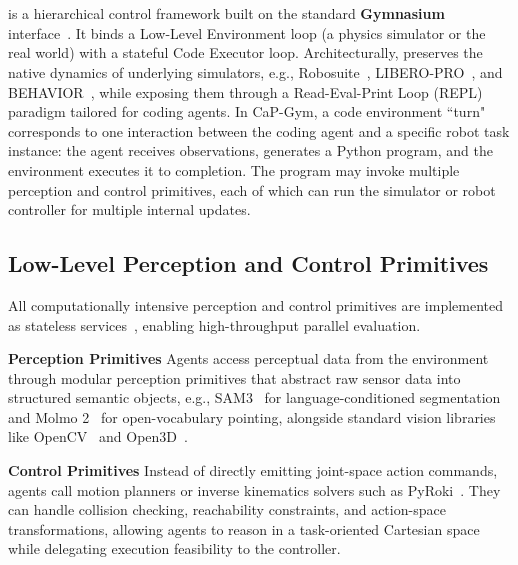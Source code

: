 \section{\gymname{}} 
\gymname{} is a hierarchical control framework built on the standard \textbf{Gymnasium} interface~\citep{brockman2016openai}. It binds a Low-Level Environment loop (a physics simulator or the real world) with a stateful Code Executor loop. 
Architecturally, \gymname{} preserves the native dynamics of underlying simulators, e.g., Robosuite~\citep{zhu2020robosuite}, LIBERO-PRO~\citep{liu2023libero, zhou2025liberopro}, and BEHAVIOR~\citep{li2024behavior1k}, while exposing them through a Read-Eval-Print Loop (REPL) paradigm tailored for coding agents. In CaP-Gym, a code environment ``turn" corresponds to one interaction between the coding agent and a specific robot task instance: the agent receives observations, generates a Python program, and the environment executes it to completion. The program may invoke multiple perception and control primitives, each of which can run the simulator or robot controller for multiple internal updates.

\subsection{Low-Level Perception and Control Primitives}
All computationally intensive perception and control primitives are implemented as stateless services~\cite{uvicorn}, enabling high-throughput parallel evaluation.

\textbf{Perception Primitives} 
Agents access perceptual data from the environment through modular perception primitives that abstract raw sensor data into structured semantic objects, e.g., SAM3~\cite{carion2025sam3} for language-conditioned segmentation and Molmo 2~\cite{clark2026molmo2} for open-vocabulary pointing, alongside standard vision libraries like OpenCV~\citep{opencv_library} and Open3D~\citep{zhou2018open3d}. 

\textbf{Control Primitives} Instead of directly emitting joint-space action commands, agents call motion planners or inverse kinematics solvers such as PyRoki~\cite{kim2025pyroki}. They can handle collision checking, reachability constraints, and action-space transformations, allowing agents to reason in a task-oriented Cartesian space while delegating execution feasibility to the controller. 
